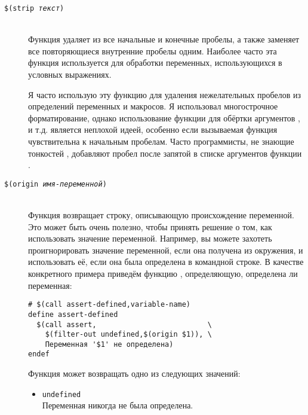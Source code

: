 \begin{description}
\item[\texttt{\${}(strip \emph{текст})}] \hfill \\
Функция  удаляет из  все начальные
и конечные пробелы, а также заменяет все повторяющиеся внутренние
пробелы одним. Наиболее часто эта функция используется для обработки
переменных, использующихся в условных выражениях.

Я часто использую эту функцию для удаления нежелательных пробелов из
определений переменных и макросов. Я использовал многострочное
форматирование, однако использование функции  для
обёртки аргументов ,  и т.д. является
неплохой идеей, особенно если вызываемая функция чувствительна к
начальным пробелам. Часто программисты, не знающие тонкостей
\GNUmake{}, добавляют пробел после запятой в списке аргументов функции
.

\item[\texttt{\${}(origin \emph{имя-переменной})}] \hfill \\
Функция  возвращает строку, описывающую происхождение
переменной. Это может быть очень полезно, чтобы принять решение о том,
как использовать значение переменной. Например, вы можете захотеть
проигнорировать значение переменной, если она получена из окружения, и
использовать её, если она была определена в командной строке.  В
качестве конкретного примера приведём функцию
, определяющую, определена ли переменная:

{\footnotesize
\begin{verbatim}
# $(call assert-defined,variable-name)
define assert-defined
  $(call assert,                          \
    $(filter-out undefined,$(origin $1)), \
    Переменная '$1' не определена)
endef
\end{verbatim}
}

Функция  может возвращать одно из следующих значений:
\begin{itemize}
\item \texttt{undefined} \hfill \\
Переменная никогда не была определена.


\end{itemize}
\end{description}
